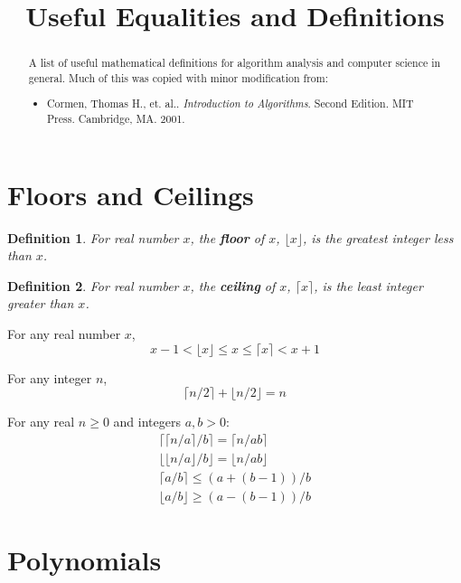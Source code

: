 \documentclass[]{tufte-handout}
\title{Useful Equalities and Definitions}
\author{}
\date{}
\newtheorem{definition}{Definition}
\begin{document}
\maketitle

\begin{abstract}
A list of useful mathematical definitions for algorithm analysis and computer science in general. Much of this was copied with minor modification from:
\begin{itemize}
\item Cormen, Thomas H., et. al.. \textit{Introduction to Algorithms}. Second Edition. MIT Press. Cambridge, MA. 2001.
\end{itemize}

\end{abstract}


\section{Floors and Ceilings}

\begin{definition}
For real number $x$, the \textbf{floor} of $x$, $\lfloor x \rfloor$, is the greatest integer less than $x$.
\end{definition}

\begin{definition}
For real number $x$, the \textbf{ceiling} of $x$, $\lceil x \rceil$, is the least integer greater than $x$.
\end{definition}

For any real number $x$,
\begin{equation}
x-1 < \lfloor x \rfloor \leq x \leq \lceil x \rceil < x+1
\end{equation}

For any integer $n$,
\begin{equation}
\lceil n/2 \rceil + \lfloor n/2 \rfloor = n
\end{equation}

For any real $n \geq 0$ and integers $a,b > 0$:
\begin{eqnarray}
\lceil \lceil n/a \rceil / b\rceil = \lceil n/ab \rceil \\
\lfloor \lfloor n/a \rfloor / b \rfloor = \lfloor n/ab \rfloor \\
\lceil a/b \rceil \leq (a + (b-1))/b \\
\lfloor a/b \rfloor \geq (a - (b-1))/b 
\end{eqnarray}

\section{Polynomials}
\end{document}

